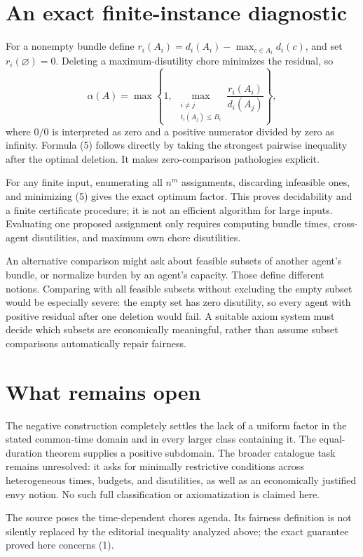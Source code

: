 \documentclass[11pt,a4paper]{article}
\begin{document}
\section{An exact finite-instance diagnostic}
For a nonempty bundle define
$r_i(A_i)=d_i(A_i)-\max_{c\in A_i}d_i(c)$, and set $r_i(\varnothing)=0$. Deleting a maximum-disutility chore minimizes the residual, so
\[
 \alpha(A)=\max\left\{1,\
 \max_{\substack{i\ne j\\t_i(A_j)\le B_i}}
 \frac{r_i(A_i)}{d_i(A_j)}\right\},
 \tag{5}
\]
where $0/0$ is interpreted as zero and a positive numerator divided by zero as infinity. Formula (5) follows directly by taking the strongest pairwise inequality after the optimal deletion. It makes zero-comparison pathologies explicit.

For any finite input, enumerating all $n^m$ assignments, discarding infeasible ones, and minimizing (5) gives the exact optimum factor. This proves decidability and a finite certificate procedure; it is not an efficient algorithm for large inputs. Evaluating one proposed assignment only requires computing bundle times, cross-agent disutilities, and maximum own chore disutilities.

An alternative comparison might ask about feasible subsets of another agent's bundle, or normalize burden by an agent's capacity. Those define different notions. Comparing with all feasible subsets without excluding the empty subset would be especially severe: the empty set has zero disutility, so every agent with positive residual after one deletion would fail. A suitable axiom system must decide which subsets are economically meaningful, rather than assume subset comparisons automatically repair fairness.
\section{What remains open}
The negative construction completely settles the lack of a uniform factor in the stated common-time domain and in every larger class containing it. The equal-duration theorem supplies a positive subdomain. The broader catalogue task remains unresolved: it asks for minimally restrictive conditions across heterogeneous times, budgets, and disutilities, as well as an economically justified envy notion. No such full classification or axiomatization is claimed here.

The source poses the time-dependent chores agenda. Its fairness definition is not silently replaced by the editorial inequality analyzed above; the exact guarantee proved here concerns (1).
\end{document}
